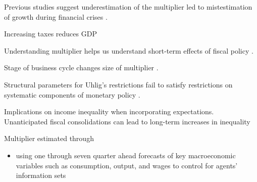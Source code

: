 
Previous studies suggest underestimation of the multiplier led to mistestimation of growth during financial crises \parencite{blanchard2013growth}.  

Increasing taxes reduces GDP \parencite{barro2011macroeconomic}

Understanding multiplier helps us understand short-term effects of fiscal policy \parencite{eyraud2013challenge}.

Stage of business cycle changes size of multiplier \parencite{baum2012fiscal}.


Structural parameters for Uhlig's restrictions fail to satisfy restrictions on systematic components of monetary policy \parencite{arias2019systematic}.

Implications on income inequality when incorporating expectations.  Unanticipated fiscal consolidations can lead to long-term increases in inequality \parencite{furceri2022distributional}


Multiplier estimated through
\begin{itemize}
    \item using one through seven quarter ahead forecasts of key macroeconomic variables such as consumption, output, and wages to control for agents' information sets \parencite{hall2023economic}
\end{itemize}


